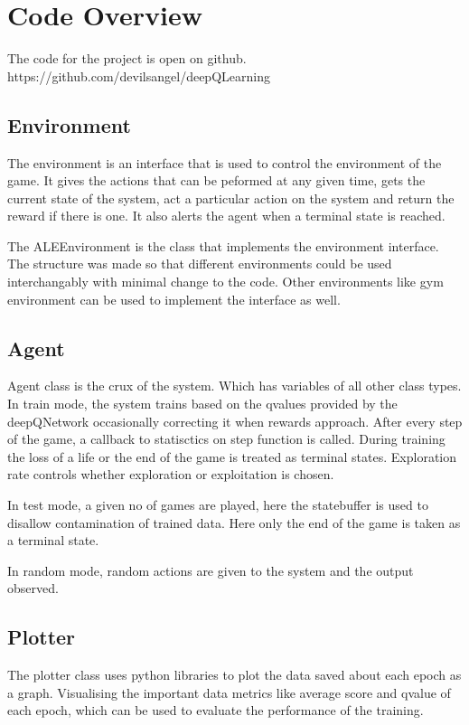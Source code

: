 \documentclass[a4paper,11pt]{report}
\begin{document}
		\section{Code Overview}
			The code for the project is open on github. https://github.com/devilsangel/deepQLearning

			\subsection{Environment}
				The environment is an interface that is used to control the environment of the game. It gives the actions that can be peformed at any given time, gets the current state of the system, act a particular action on the system and return the reward if there is one. It also alerts the agent when a terminal state is reached.

				The ALEEnvironment is the class that implements the environment interface. The structure was made so that different environments could be used interchangably with minimal change to the code. Other environments like gym environment can be used to implement the interface as well.

			\subsection{Agent}
				Agent class is the crux of the system. Which has variables of all other class types. In train mode, the system trains based on the qvalues provided by the deepQNetwork occasionally correcting it when rewards approach. After every step of the game, a callback to statisctics on step function is called. During training the loss of a life or the end of the game is treated as terminal states. Exploration rate controls whether exploration or exploitation is chosen. 

				In test mode, a given no of games are played, here the statebuffer is used to disallow contamination of trained data. Here only the end of the game is taken as a terminal state.

				In random mode, random actions are given to the system and the output observed.

			\subsection{Plotter}
				The plotter class uses python libraries to plot the data saved about each epoch as a graph. Visualising the important data metrics like average score and qvalue of each epoch, which can be used to evaluate the performance of the training.
\end{document}

